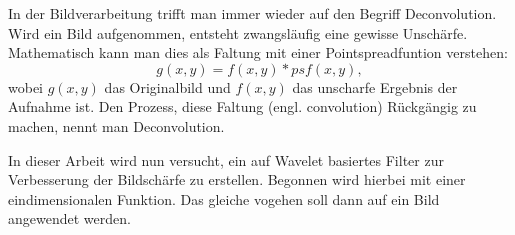 In der Bildverarbeitung trifft man immer wieder auf den Begriff Deconvolution.
Wird ein Bild aufgenommen, entsteht zwangsläufig eine gewisse Unschärfe.
Mathematisch kann man dies als Faltung mit einer Pointspreadfuntion verstehen:
$$g(x,y) = f(x,y)*psf(x,y),$$
wobei $g(x,y)$ das Originalbild und $f(x,y)$ das unscharfe Ergebnis der Aufnahme ist.
Den Prozess, diese Faltung (engl. convolution) Rückgängig zu machen, nennt man Deconvolution.

In dieser Arbeit wird nun versucht, ein auf Wavelet basiertes Filter zur Verbesserung der Bildschärfe zu erstellen. Begonnen wird hierbei mit einer eindimensionalen Funktion. Das gleiche vogehen soll dann auf ein Bild angewendet werden.

